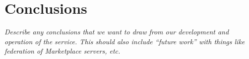 \section{Conclusions}
\label{sec:conclusions}

{\em Describe any conclusions that we want to draw from our
  development and operation of the service.  This should also include
  ``future work'' with things like federation of Marketplace servers,
  etc.}
